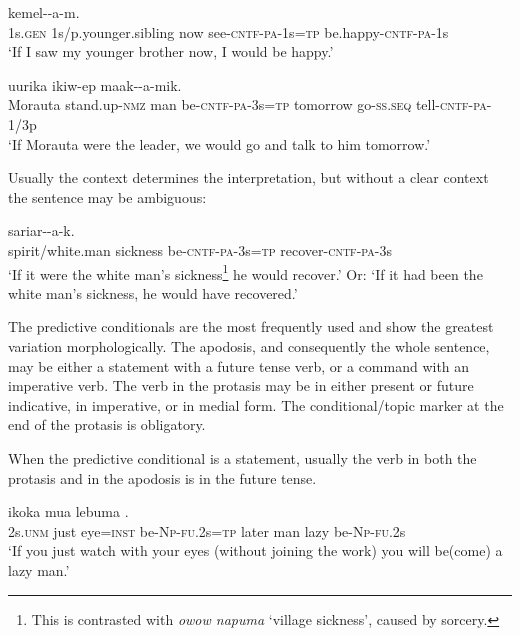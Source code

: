 \ea%
\label{ex:8:x1646}
\gll [Yena  aamun  aakisa  uruf-\textstyleEmphasizedVernacularWords{ek}-a-m=\textstyleEmphasizedVernacularWords{na}] kemel--a-m.\\
1s.\textsc{gen} 1s/p.younger.sibling  now  see-\textsc{cntf}-\textsc{pa}-1s=\textsc{tp} be.happy-\textsc{cntf}-\textsc{pa}-1s\\
\glt`If I saw my younger brother now, I would be happy.'
\z


\ea%
\label{ex:8:x1647}
\gll [Morauta  iimar-ow(a)  mua  ik-\textstyleEmphasizedVernacularWords{ek}-a-k=\textstyleEmphasizedVernacularWords{na},] uurika ikiw-ep  maak--a-mik.\\
Morauta  stand.up-\textsc{nmz} man be-\textsc{cntf}-\textsc{pa}-3s=\textsc{tp} tomorrow go-\textsc{ss}.\textsc{seq} tell-\textsc{cntf}-\textsc{pa}-1/3p\\
\glt`If Morauta were the leader, we would go and talk to him tomorrow.'
\z


Usually the context determines the interpretation, but without a clear context the sentence may be ambiguous:  

\ea%
\label{ex:8:x1648}
\gll [Inasin  napuma  ik-\textstyleEmphasizedVernacularWords{ek}-a-k=\textstyleEmphasizedVernacularWords{na}]  sariar--a-k.\\
spirit/white.man sickness be-\textsc{cntf}-\textsc{pa}-3s=\textsc{tp} recover-\textsc{cntf}-\textsc{pa}-3s\\
\glt`If it were the white man's sickness\footnote{This is contrasted with \textit{owow napuma} `village sickness', caused by sorcery.} he would recover.' Or: `If it had been the white man's sickness, he would have recovered.'
\z


The predictive conditionals are the most frequently used and show the greatest variation morphologically. The apodosis, and consequently the whole sentence, may be either a statement with a future tense verb, or a command with an imperative verb. The verb in the protasis may be in either present or future indicative, in imperative, or in medial form. The conditional/topic marker at the end of the protasis is obligatory. 

When the predictive conditional is a statement, usually the verb in both the protasis and in the apodosis is in the future tense.

\ea%
\label{ex:8:x1652}
\gll [No  oram  mokok=iw  \textstyleEmphasizedVernacularWords{ika-i-nan=na}]  ikoka  mua  lebuma \textstyleEmphasizedVernacularWords{-}\textstyleEmphasizedVernacularWords{-}.\\
2s.\textsc{unm} just  eye=\textsc{inst} be-\textsc{Np}-\textsc{fu}.2s=\textsc{tp} later  man  lazy be-\textsc{Np}-\textsc{fu}.2s\\
\glt`If you just watch with your eyes (without joining the work) you will be(come) a lazy man.'
\z


